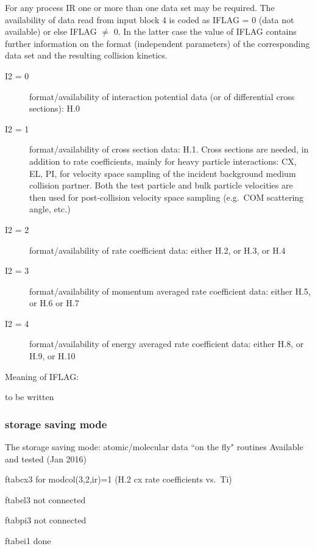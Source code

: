 For any process IR one or more than one data set may be required.
The availability of data read from input block 4 is coded as IFLAG = 0 (data
not available) or else IFLAG $\neq$ 0.
In the latter case the value of IFLAG contains further information on the
format (independent parameters) of the corresponding data set and the resulting
collision kinetics.
\begin{description}
  \item[I2 = 0] format/availability of interaction potential data (or of
        differential cross sections): H.0
  \item[I2 = 1] format/availability of cross
        section data: H.1.
        Cross sections are needed, in addition to rate coefficients, mainly for heavy
        particle interactions: CX, EL, PI, for velocity space sampling of the incident
        background medium collision partner.
        Both the test particle and bulk particle velocities are then used for
        post-collision velocity space sampling (e.g.\ COM scattering angle, etc.)
  \item[I2 = 2] format/availability of rate coefficient data: either H.2, or H.3,
        or H.4
  \item[I2 = 3] format/availability of momentum averaged rate coefficient
        data:
        either H.5, or H.6 or H.7

  \item[I2 = 4] format/availability of energy averaged rate coefficient data:
        either H.8, or H.9, or H.10
\end{description}
Meaning of IFLAG:

to be written

\subsubsection{storage saving mode}

The storage saving mode: atomic\slash molecular data ``on the fly" routines
Available and tested (Jan 2016)

ftabcx3 for modcol(3,2,ir)=1  (H.2 cx rate coefficients vs.\ Ti)

ftabel3 not connected

ftabpi3 not connected

ftabei1 done
